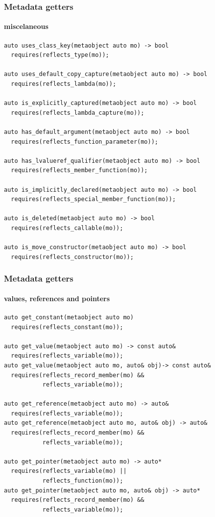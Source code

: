 \documentclass[compress,table,xcolor=table]{beamer}
\begin{document}
\begin{frame}[fragile]
  \frametitle{Metadata getters}
  \framesubtitle{miscelaneous}
  \begin{lstlisting}[language=c++2x,basicstyle=\scriptsize\ttfamily]
auto uses_class_key(metaobject auto mo) -> bool
  requires(reflects_type(mo));

auto uses_default_copy_capture(metaobject auto mo) -> bool
  requires(reflects_lambda(mo));

auto is_explicitly_captured(metaobject auto mo) -> bool
  requires(reflects_lambda_capture(mo));

auto has_default_argument(metaobject auto mo) -> bool
  requires(reflects_function_parameter(mo));

auto has_lvalueref_qualifier(metaobject auto mo) -> bool
  requires(reflects_member_function(mo));

auto is_implicitly_declared(metaobject auto mo) -> bool
  requires(reflects_special_member_function(mo));

auto is_deleted(metaobject auto mo) -> bool
  requires(reflects_callable(mo));

auto is_move_constructor(metaobject auto mo) -> bool
  requires(reflects_constructor(mo));
  \end{lstlisting}
\end{frame}
\begin{frame}[fragile]
  \frametitle{Metadata getters}
  \framesubtitle{values, references and pointers}
  \begin{lstlisting}[language=c++2x,basicstyle=\scriptsize\ttfamily]
auto get_constant(metaobject auto mo)
  requires(reflects_constant(mo));

auto get_value(metaobject auto mo) -> const auto&
  requires(reflects_variable(mo));
auto get_value(metaobject auto mo, auto& obj)-> const auto&
  requires(reflects_record_member(mo) &&
           reflects_variable(mo));

auto get_reference(metaobject auto mo) -> auto&
  requires(reflects_variable(mo));
auto get_reference(metaobject auto mo, auto& obj) -> auto&
  requires(reflects_record_member(mo) &&
           reflects_variable(mo));

auto get_pointer(metaobject auto mo) -> auto*
  requires(reflects_variable(mo) ||
           reflects_function(mo));
auto get_pointer(metaobject auto mo, auto& obj) -> auto*
  requires(reflects_record_member(mo) &&
           reflects_variable(mo));
  \end{lstlisting}
\end{frame}
\end{document}
